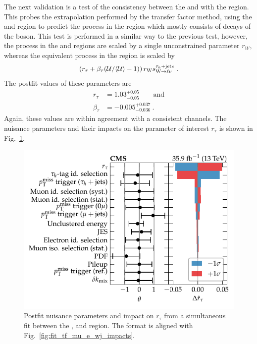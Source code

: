 The next validation is a test of the consistency between the \muplusjets and
\eleplusjets with the \tauplusjets region. This probes the extrapolation
performed by the transfer factor method, using the \muplusjets and
\eleplusjets region to predict the \IWj process in the \metplusjets region
which mostly consists of \Ptauh decays of the \PW boson. This test is
performed in a similar way to the previous test, however, the \IWj process in
the \muplusjets and \eleplusjets regions are scaled by a single unconstrained
parameter $r_W$, whereas the equivalent process in the \tauplusjets region is
scaled by
%
\begin{equation}
    \left(r_\tau + \beta_\tau (\mathcal{U}/\langle \mathcal{U} \rangle - 1)\right) r_\PW s_{\IWlv}^{\tauplusjets}\ .
\end{equation}
%
The postfit values of these parameters are
%
\begin{align}
    r_\tau & = 1.03^{+0.05}_{-0.05}\qquad\mathrm{and} \nonumber\\
    \beta_\tau & = -0.005^{+0.037}_{-0.036}\ .
\end{align}
%
Again, these values are within agreement with a consistent \eleplusjets
channels. The nuisance parameters and their impacts on the parameter of
interest $r_\tau$ is shown in Fig.~\ref{fig:fit_tf_mue_t_wj_impacts}.
%
\begin{figure}[htb]
    \centering
    \includegraphics{chapters/042_backgrounds/images/impacts_tfmue2twj.pdf}
    \caption[Nuisance parameters from a fit with the transfer factor method from the muon and electron control regions to the $\tau$-lepton validation region.]{
        Postfit nuisance parameters and impact on $r_\tau$ from a simultaneous fit between the \muplusjets, \eleplusjets and \tauplusjets region. The format is aligned with Fig.~\ref{fig:fit_tf_mu_e_wj_impacts}.
    }
    \label{fig:fit_tf_mue_t_wj_impacts}
\end{figure}
